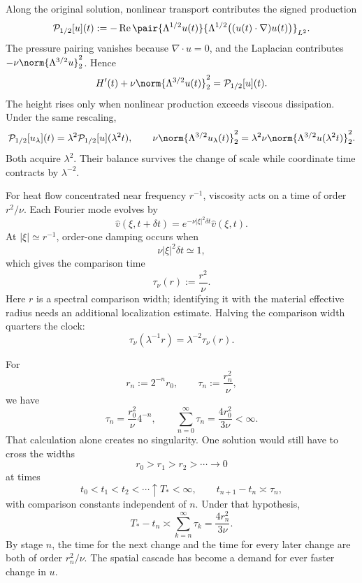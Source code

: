 Along the original solution, nonlinear transport contributes the signed production
\[
  \mathcal P_{1/2}[u](t)
  :=
  -\operatorname{Re}
  \pair
    {\Lambda^{1/2}u(t)}
    {\Lambda^{1/2}\bigl((u(t)\cdot\nabla)u(t)\bigr)}_{L^2}.
\]
The pressure pairing vanishes because \(\nabla\cdot u=0\), and the Laplacian contributes \(-\nu\norm{\Lambda^{3/2}u}_2^2\). Hence
\[
  H'(t)
  +
  \nu\norm{\Lambda^{3/2}u(t)}_2^2
  =
  \mathcal P_{1/2}[u](t).
\]
The height rises only when nonlinear production exceeds viscous dissipation. Under the same rescaling,
\[
  \mathcal P_{1/2}[u_\lambda](t)
  =
  \lambda^2\mathcal P_{1/2}[u](\lambda^2t),
  \qquad
  \nu\norm{\Lambda^{3/2}u_\lambda(t)}_2^2
  =
  \lambda^2\nu\norm{\Lambda^{3/2}u(\lambda^2t)}_2^2.
\]
Both acquire \(\lambda^2\). Their balance survives the change of scale while coordinate time contracts by \(\lambda^{-2}\).


For heat flow concentrated near frequency \(r^{-1}\), viscosity acts on a time of order \(r^2/\nu\). Each Fourier mode evolves by
\[
  \widehat v(\xi,t+\delta t)
  =
  e^{-\nu|\xi|^2\delta t}\widehat v(\xi,t).
\]
At \(|\xi|\simeq r^{-1}\), order-one damping occurs when
\[
  \nu|\xi|^2\delta t\simeq1,
\]
which gives the comparison time
\[
  \tau_\nu(r)
  :=
  \frac{r^2}{\nu}.
\]
Here \(r\) is a spectral comparison width; identifying it with the material effective radius needs an additional localization estimate. Halving the comparison width quarters the clock:
\[
  \tau_\nu(\lambda^{-1}r)
  =
  \lambda^{-2}\tau_\nu(r).
\]


For
\[
  r_n:=2^{-n}r_0,
  \qquad
  \tau_n:=\frac{r_n^2}{\nu},
\]
we have
\[
  \tau_n
  =
  \frac{r_0^2}{\nu}4^{-n},
  \qquad
  \sum_{n=0}^{\infty}\tau_n
  =
  \frac{4r_0^2}{3\nu}
  <
  \infty.
\]
That calculation alone creates no singularity. One \NavierStokes{} solution would still have to cross the widths
\[
  r_0>r_1>r_2>\cdots\longrightarrow0
\]
at times
\[
  t_0<t_1<t_2<\cdots\uparrow T_*<\infty,
  \qquad
  t_{n+1}-t_n\asymp\tau_n,
\]
with comparison constants independent of \(n\). Under that hypothesis,
\[
  T_*-t_n
  \asymp
  \sum_{k=n}^{\infty}\tau_k
  =
  \frac{4r_n^2}{3\nu}.
\]
By stage \(n\), the time for the next change and the time for every later change are both of order \(r_n^2/\nu\). The spatial cascade has become a demand for ever faster change in \(u\).

